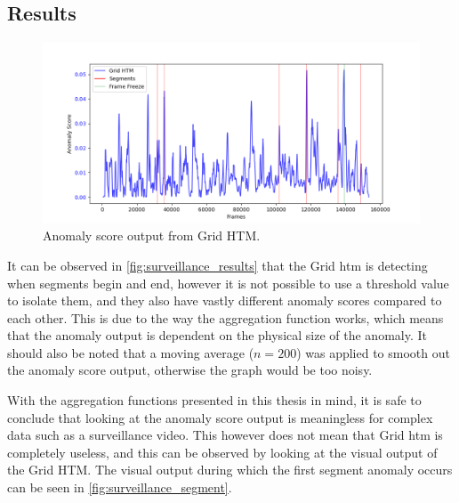 \subsection{Results}
\begin{figure}[H]
    \centering
    \includegraphics[width=\textwidth]{resources/experiments/surveillance/surveillance_result}
    \caption[Grid HTM Anomaly Score Output]{Anomaly score output from Grid HTM.}
    \label{fig:surveillance_results}
\end{figure}
It can be observed in \autoref{fig:surveillance_results} that the Grid \gls*{htm} is detecting when segments begin and end, however it is not possible to use a threshold value to isolate them, and they also have vastly different anomaly scores compared to each other. This is due to the way the aggregation function works, which means that the anomaly output is dependent on the physical size of the anomaly. It should also be noted that a moving average ($n=200$) was applied to smooth out the anomaly score output, otherwise the graph would be too noisy.
\par
With the aggregation functions presented in this thesis in mind, it is safe to conclude that looking at the anomaly score output is meaningless for complex data such as a surveillance video. This however does not mean that Grid \gls*{htm} is completely useless, and this can be observed by looking at the visual output of the Grid HTM. The visual output during which the first segment anomaly occurs can be seen in \autoref{fig:surveillance_segment}.
